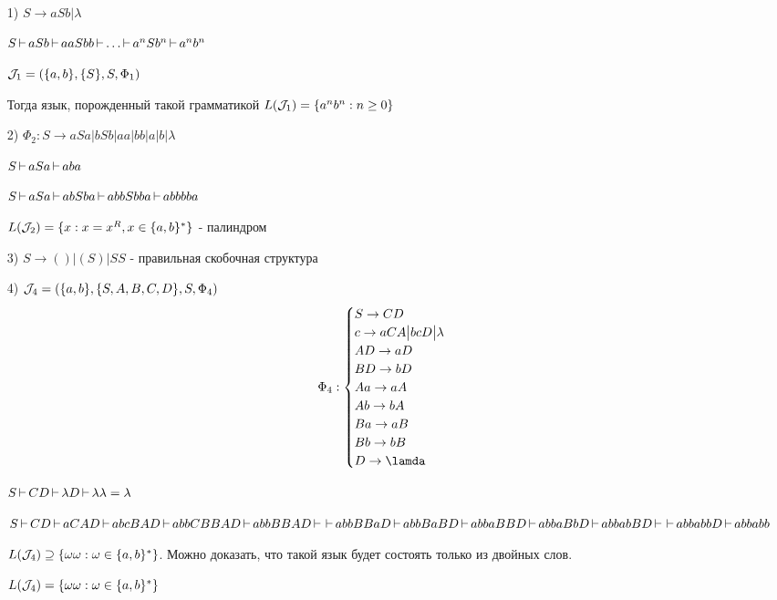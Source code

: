 \begin{itemize}
    \item[1)] $S \to  aSb\big|\lambda$

        $S \operatorname{\vdash} aSb \operatorname{\vdash} aaSbb \operatorname{\vdash} \ldots \operatorname{\vdash} a^{n}Sb^{n} \operatorname{\vdash} a^{n}b^{n}$

        ${\cal J}_1 = (\{a,b\}, \{S\}, S, \Phi_1)$ 

        Тогда язык, порожденный такой грамматикой \newline $L({\cal J}_1) = \{a^{n}b^{n}:n \ge 0\} $ 
    \item[2)] $\Phi_2: S \to aSa \big| bSb \big| aa \big| bb \big| a \big| b \big| \lambda$

        $S \operatorname{\vdash} aSa \operatorname{\vdash} aba$

        $S \operatorname{\vdash} aSa \operatorname{\vdash} abSba \operatorname{\vdash} abbSbba \operatorname{\vdash} abbbba$

        $L({\cal J}_2) = \{x: x = x^{R}, x \in \{a,b\}^{*} \}$ - палиндром
    \item[3)] $S \to ()\big|(S)\big|SS$ - правильная скобочная структура
    \item[4)] ${\cal J}_4 = (\{a,b\}, \{S,A,B,C,D\}, S, \Phi_4)$ 
        \[
        \Phi_4: \begin{cases}
            S \to CD\\
            c \to aCA\big|bcD\big|\lambda\\
            AD \to aD\\
            BD \to bD\\
            Aa \to aA\\
            Ab \to bA\\
            Ba \to aB\\
            Bb \to bB\\
            D \to \lamda
        \end{cases}
        \]

        $S \operatorname{\vdash} CD \operatorname{\vdash} \lambda D \operatorname{\vdash} \lambda\lambda = \lambda$

         $S \step CD \step aCAD \step abcBAD \step abbCBBAD \step abbBBAD \step \newline
         \step abbBBaD \step abbBaBD \step abbaBBD \step abbaBbD \step abbabBD \step \newline
         \step abbabbD \step abbabb$

          $L({\cal J}_4) \supseteq \{\omega\omega: \omega \in \{a,b\}^{*} \} $. Можно доказать,
          что такой язык будет состоять только из двойных слов.

          $L({\cal J}_4) = \{\omega\omega: \omega \in \{a,b\}^{*} \} $
\end{itemize}


